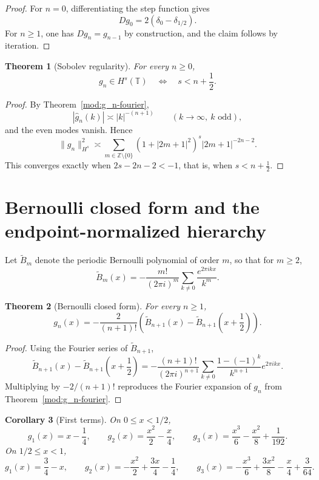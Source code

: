 \documentclass[11pt,a4paper]{article}
\numberwithin{equation}{section}
\newtheorem{theorem}{Theorem}[section]
\newtheorem{corollary}[theorem]{Corollary}
\theoremstyle{definition}
\theoremstyle{remark}
\newcommand{\ZZ}{\mathbb Z}
\begin{document}
\begin{proof}
For $n=0$, differentiating the step function gives
\[
Dg_0=2(\delta_0-\delta_{1/2}).
\]
For $n\ge 1$, one has $Dg_n=g_{n-1}$ by construction, and the claim follows by iteration.
\end{proof}

\begin{theorem}[Sobolev regularity]\label{mod:sobolev}
For every $n\ge 0$,
\[
g_n\in H^s(\mathbb T)
\quad\Longleftrightarrow\quad
s<n+\frac12.
\]
\end{theorem}

\begin{proof}
By Theorem~\ref{mod:g_n-fourier},
\[
|\widehat g_n(k)|\asymp |k|^{-(n+1)}
\qquad
(k\to\infty,\ k\text{ odd}),
\]
and the even modes vanish.  Hence
\[
\|g_n\|_{H^s}^2
\asymp
\sum_{m\in\ZZ\setminus\{0\}}
(1+|2m+1|^2)^s |2m+1|^{-2n-2}.
\]
This converges exactly when $2s-2n-2<-1$, that is, when $s<n+\frac12$.
\end{proof}

\section{Bernoulli closed form and the endpoint-normalized hierarchy}

Let $\widetilde B_m$ denote the periodic Bernoulli polynomial of order $m$, so that for $m\ge 2$,
\[
\widetilde B_m(x)
=
-\frac{m!}{(2\pi i)^m}\sum_{k\neq 0}\frac{e^{2\pi ikx}}{k^m}.
\]

\begin{theorem}[Bernoulli closed form]\label{mod:bernoulli}
For every $n\ge 1$,
\[
g_n(x)
=
-\frac{2}{(n+1)!}\left(
\widetilde B_{n+1}(x)-\widetilde B_{n+1}\!\left(x+\frac12\right)
\right).
\]
\end{theorem}

\begin{proof}
Using the Fourier series of $\widetilde B_{n+1}$,
\[
\widetilde B_{n+1}(x)-\widetilde B_{n+1}\!\left(x+\frac12\right)
=
-\frac{(n+1)!}{(2\pi i)^{n+1}}
\sum_{k\neq 0}\frac{1-(-1)^k}{k^{n+1}}e^{2\pi ikx}.
\]
Multiplying by $-2/(n+1)!$ reproduces the Fourier expansion of $g_n$ from Theorem~\ref{mod:g_n-fourier}.
\end{proof}

\begin{corollary}[First terms]\label{mod:first-terms}
On $0\le x<1/2$,
\[
g_1(x)=x-\frac14,
\qquad
g_2(x)=\frac{x^2}{2}-\frac{x}{4},
\qquad
g_3(x)=\frac{x^3}{6}-\frac{x^2}{8}+\frac1{192}.
\]
On $1/2\le x<1$,
\[
g_1(x)=\frac34-x,
\qquad
g_2(x)=-\frac{x^2}{2}+\frac{3x}{4}-\frac14,
\qquad
g_3(x)=-\frac{x^3}{6}+\frac{3x^2}{8}-\frac{x}{4}+\frac3{64}.
\]
\end{corollary}
\end{document}
